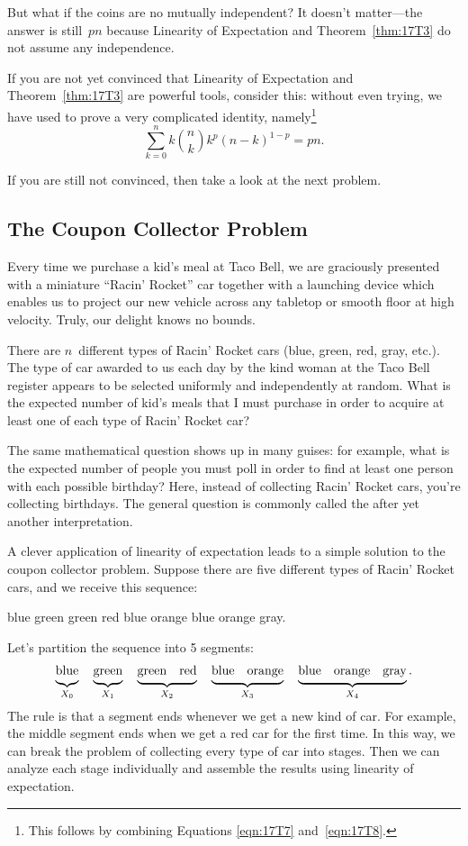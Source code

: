 But what if the coins are no mutually independent?  It doesn't
matter---the answer is still~$pn$ because Linearity of Expectation
and Theorem~\ref{thm:17T3} do not assume any independence.

If you are not yet convinced that Linearity of Expectation and
Theorem~\ref{thm:17T3} are powerful tools, consider this: without even
trying, we have used to prove a very complicated identity,
namely\footnote{This follows by combining Equations \ref{eqn:17T7}
  and~\ref{eqn:17T8}.}
\begin{equation*}
    \sum_{k = 0}^n k \binom{n}{k} k^p (n - k)^{1 - p} = pn.
\end{equation*}

If you are still not convinced, then take a look at the next problem.

\subsection{The Coupon Collector Problem}

Every time we purchase a kid's meal at Taco Bell, we are graciously
presented with a miniature ``Racin' Rocket'' car together with a
launching device which enables us to project our new vehicle across
any tabletop or smooth floor at high velocity.  Truly, our delight
knows no bounds.

There are $n$~different types of Racin' Rocket cars (blue, green, red,
gray, etc.).  The type of car awarded to us each day by the kind woman
at the Taco Bell register appears to be selected uniformly and
independently at random.  What is the expected number of kid's meals
that I must purchase in order to acquire at least one of each type of
Racin' Rocket car?

The same mathematical question shows up in many guises: for example,
what is the expected number of people you must poll in order to find
at least one person with each possible birthday?  Here, instead of
collecting Racin' Rocket cars, you're collecting birthdays.  The
general question is commonly called the  after yet another interpretation.

A clever application of linearity of expectation leads to a simple
solution to the coupon collector problem.  Suppose there are five
different types of Racin' Rocket cars, and we receive this sequence:
%
\begin{center}
blue \quad green \quad green \quad red \quad blue \quad orange \quad
blue \quad orange \quad gray.
\end{center}
%
Let's partition the sequence into 5 segments:
%
\[
\underbrace{\strut\text{blue}}_{X_0} \quad
\underbrace{\strut\text{green}}_{X_1} \quad
\underbrace{\strut\text{green} \quad \text{red}}_{X_2} \quad
\underbrace{\strut\text{blue} \quad \text{orange}}_{X_3} \quad
\underbrace{\strut\text{blue} \quad \text{orange} \quad \text{gray}}_{X_4}.
\]
%
The rule is that a segment ends whenever we get a new kind of car.
For example, the middle segment ends when we get a red car for the
first time.  In this way, we can break the problem of collecting every
type of car into stages.  Then we can analyze each stage individually
and assemble the results using linearity of expectation.

